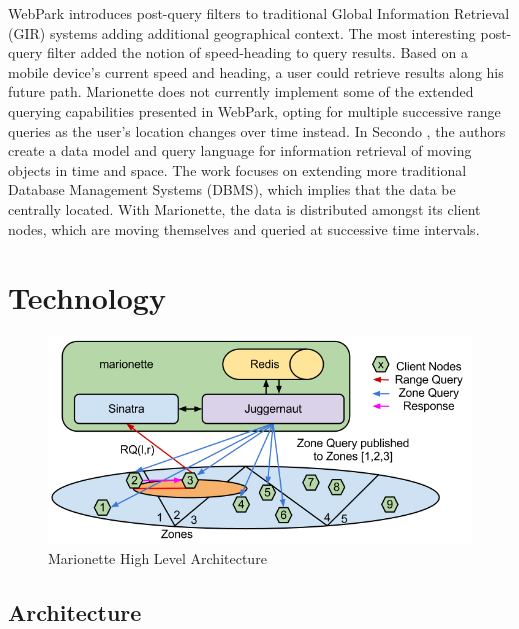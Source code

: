 \documentclass[12pt]{report}	%
\theoremstyle{definition}
\theoremstyle{remark}
\begin{document}
WebPark \cite{mountain2007geo} introduces post-query
filters to traditional Global Information Retrieval (GIR) systems adding
additional geographical context. The most interesting post-query filter
added the notion of speed-heading to query results. Based on a mobile device's
current speed and heading, a user could retrieve results along his future
path. Marionette does not currently implement some of the extended
querying capabilities presented in WebPark, opting for multiple
successive range queries as the user's location changes over time
instead. In Secondo \cite{teixeira2006querying}, the
authors create a data model and query language for information retrieval
of moving objects in time and space. The work focuses on extending more
traditional Database Management Systems (DBMS), which implies that the
data be centrally located. With Marionette, the data is distributed
amongst its client nodes, which are moving themselves and queried at
successive time intervals.

\chapter{Technology}

\begin{figure}[h!]
\centering
\includegraphics[scale=0.6]{0.png}
\caption{Marionette High Level Architecture}
\label{hla}
\end{figure}

\section{Architecture}
\end{document}
